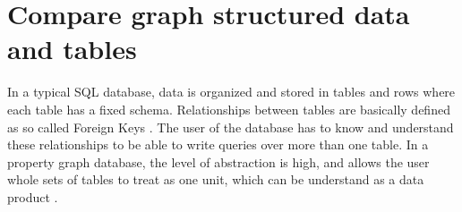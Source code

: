 \section{Compare graph structured data and tables}
\label{sec:iso:compare_graph_structured_data_and_tables}
In a typical SQL database, data is organized and stored in tables and rows where each 
table has a fixed schema.
Relationships between tables are basically defined as so called Foreign Keys \citep{1702016}.
The user of the database has to know and understand these relationships to be able
to write queries over more than one table.\newline
In a property graph database, the level of abstraction is high, and allows the user 
whole sets of tables to treat as one unit, which can be understand as a data product \citep{PINO2024100997}.
